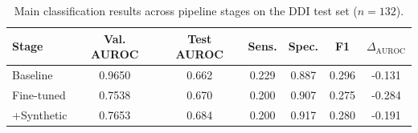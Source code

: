 \begin{table}[htbp]
\centering
\caption{Main classification results across pipeline stages on the DDI test set ($n=132$).}
\label{tab:main_results}
\begin{tabular}{lcccccc}
\toprule
\textbf{Stage} & Val. AUROC & Test AUROC & Sens. & Spec. & F1 & $\Delta_{\text{AUROC}}$ \\
\midrule
Baseline & 0.9650 & 0.662 & 0.229 & 0.887 & 0.296 & -0.131 \\
Fine-tuned & 0.7538 & 0.670 & 0.200 & 0.907 & 0.275 & -0.284 \\
+Synthetic & 0.7653 & 0.684 & 0.200 & 0.917 & 0.280 & -0.191 \\
\bottomrule
\end{tabular}
\end{table}
